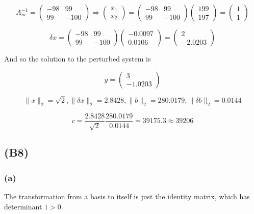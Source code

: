 \documentclass{article}
\begin{document}
\[A_m^{-1} = \left(\begin{array}{cc} -98 & 99 \\ 99 & -100 \end{array}\right) \Longrightarrow \left(\begin{array}{c} x_1 \\ x_2 \end{array}\right) = \left(\begin{array}{cc} -98 & 99 \\ 99 & -100 \end{array}\right) \left(\begin{array}{c} 199 \\ 197 \end{array}\right) = \left(\begin{array}{c} 1 \\ 1 \end{array}\right) \]

\[\delta x = \left(\begin{array}{cc} -98 & 99 \\ 99 & -100 \end{array}\right) \left(\begin{array}{c} -0.0097 \\ 0.0106 \end{array}\right) = \left(\begin{array}{c} 2 \\ -2.0203 \end{array}\right) \]

And so the solution to the perturbed system is 

\[ y = \left(\begin{array}{c} 3 \\ -1.0203 \end{array}\right) \]

\[ \|x\|_2 = \sqrt{2}, \|\delta x \|_2 = 2.8428, \|b\|_2 = 280.0179, \|\delta b\|_2 = 0.0144 \]

\[ c = \dfrac{2.8428}{\sqrt{2}} \dfrac{280.0179}{0.0144} = 39175.3 \approx 39206\]

\subsection{(B8)}

\subsubsection{(a)} The transformation from a basis to itself is just the identity matrix, which has determinant $1 > 0$.
\end{document}
